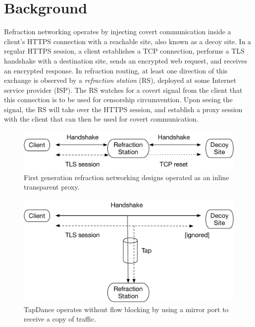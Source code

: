 \section{Background}

Refraction networking operates by injecting covert communication inside a
client's HTTPS connection with a reachable site, also known as a decoy site. In
a regular HTTPS session, a client establishes a TCP connection, performs a TLS
handshake with a destination site, sends an encrypted web request, and
receives an encrypted response. In refraction routing, at least one direction
of this exchange is observed by a \emph{refraction station} (RS), deployed at
some Internet service provider (ISP). The RS watches for a covert signal from
the client that this connection is to be used for censorship circumvention.
Upon seeing the signal, the RS will take over the HTTPS session,
and establish a proxy session with the client that can then be used for covert
communication.

\begin{figure}
    \includegraphics[width=\columnwidth]{figures/refraction-v1}
    \caption{First generation refraction networking designs operated as an inline transparent proxy.}
    \label{fig:refraction-v1}
\end{figure}

\begin{figure}
    \includegraphics[width=\columnwidth]{figures/tapdance}
    \caption{TapDance operates without flow blocking by using a mirror
    port to receive a copy of traffic.}
    \label{fig:tapdance}
  \end{figure}

